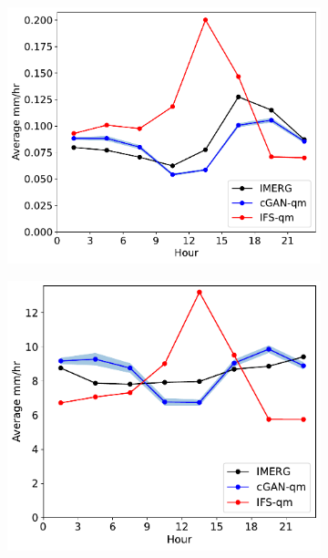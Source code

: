 \documentclass[../main.tex]{subfiles}
\begin{document}
\begin{figure}[t]
    \centering
     \begin{subfigure}[t]{0.33\textwidth}
 \includegraphics[width=\textwidth]{images/diurnal_cycle_mean_final-nologs_217600.pdf}
     \caption{}
     \end{subfigure}
     \begin{subfigure}[t]{0.32\textwidth}
     \includegraphics[width=\textwidth]{images/diurnal_cycle_quantile_999_final-nologs_217600.pdf}
     \caption{}
     \end{subfigure}

\end{figure}
\end{document}
